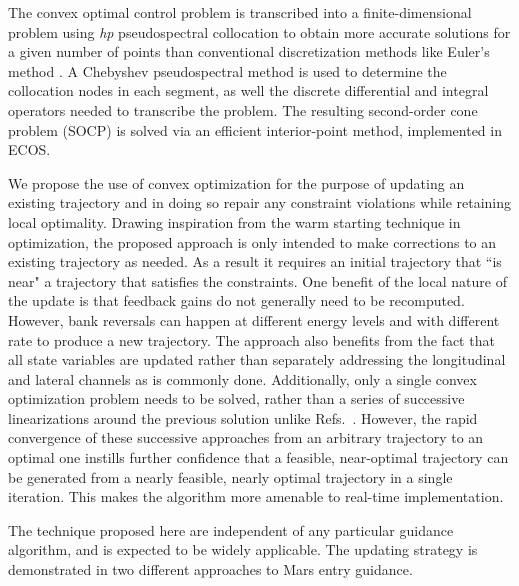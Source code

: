 \documentclass[letterpaper, preprint, paper,11pt]{AAS}	%
\begin{document}
	The convex optimal control problem is transcribed into a finite-dimensional problem using \textit{hp} pseudospectral collocation\cite{HP_PS_ConvexDescent} to obtain more accurate solutions for a given number of points than conventional discretization methods like Euler's method \cite{PS_ConvexDescent}. A Chebyshev pseudospectral method \cite{ChebyPS} is used to determine the collocation nodes in each segment, as well the discrete differential and integral operators needed to transcribe the problem. The resulting second-order cone problem (SOCP) \cite{BoydConvexBook} is solved via an efficient interior-point method, implemented in ECOS.\cite{ecos}
	
	We propose the use of convex optimization for the purpose of updating an existing trajectory and in doing so repair any constraint violations while retaining local optimality. 
	Drawing inspiration from the warm starting technique in optimization, the proposed approach is only intended to make corrections to an existing trajectory as needed. As a result it requires an initial trajectory that ``is near" a trajectory that satisfies the constraints. One benefit of the local nature of the update is that feedback gains do not generally need to be recomputed. However, bank reversals can happen at different energy levels and with different rate to produce a new trajectory. The approach also benefits from the fact that all state variables are updated rather than separately addressing the longitudinal and lateral channels as is commonly done. Additionally, only a single convex optimization problem needs to be solved, rather than a series of successive linearizations around the previous solution unlike Refs.~\cite{SeqConProg,SuccConvex1,SuccConvex2,WangConvexTraj}. However, the rapid convergence of these successive approaches from an arbitrary trajectory to an optimal one instills further confidence that a feasible, near-optimal trajectory can be generated from a nearly feasible, nearly optimal trajectory in a single iteration. This makes the algorithm more amenable to real-time implementation. 
	
	The technique proposed here are independent of any particular guidance algorithm, and is expected to be widely applicable. The updating strategy is demonstrated in two different approaches to Mars entry guidance. 
	
\end{document}

